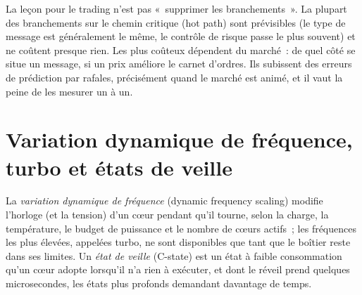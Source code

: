 \begin{omfigure}

\label{fig:ll:cpu-microarchitecture:branch}
\end{omfigure}

La leçon pour le trading n'est pas «~supprimer les branchements~». La plupart des branchements sur le chemin critique (hot path) sont prévisibles (le type de message est
généralement le même, le contrôle de risque passe le plus souvent) et ne coûtent presque rien. Les plus coûteux dépendent du marché~:
de quel côté se situe un message, si un prix améliore le carnet d'ordres. Ils subissent des erreurs de prédiction par rafales, précisément quand le marché est
animé, et il vaut la peine de les mesurer un à un.

\section{Variation dynamique de fréquence, turbo et états de veille}

\begin{definition}\label{def:ll:cpu-microarchitecture:dvfs}
La \emph{variation dynamique de fréquence} (dynamic frequency scaling) modifie l'horloge (et la tension) d'un cœur pendant qu'il tourne,
selon la charge, la température, le budget de puissance et le nombre de cœurs actifs~; les fréquences les plus élevées, appelées turbo,
ne sont disponibles que tant que le boîtier reste dans ses limites. Un \emph{état de veille} (C-state) est un
état à faible consommation qu'un cœur adopte lorsqu'il n'a rien à exécuter, et dont le réveil prend quelques microsecondes, les états
plus profonds demandant davantage de temps.
\end{definition}

